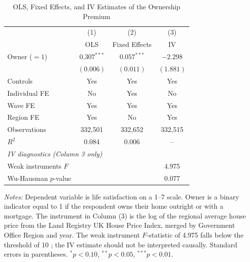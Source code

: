 \documentclass[12pt,a4paper]{article}
\begin{document}
\clearpage
\begin{table}[H]
\centering
\caption{OLS, Fixed Effects, and IV Estimates of the Ownership Premium}
\label{tab:iv}
\begin{threeparttable}
\begin{tabular}{lccc}
\toprule
 & (1) & (2) & (3) \\
 & OLS & Fixed Effects & IV \\
\midrule
Owner ($= 1$)
  & $0.307^{***}$ & $0.057^{***}$ & $-2.298$ \\
  & $(0.006)$     & $(0.011)$     & $(1.881)$ \\[0.5em]
Controls      & Yes & Yes & Yes \\
Individual FE & No  & Yes & No  \\
Wave FE       & Yes & Yes & Yes \\
Region FE     & Yes & No  & Yes \\
\midrule
Observations  & 332{,}501 & 332{,}652 & 332{,}515 \\
$R^{2}$       & 0.084     & 0.006     & --        \\[0.5em]
\multicolumn{4}{l}{\textit{IV diagnostics (Column 3 only)}} \\[0.2em]
Weak instruments $F$ & & & 4.975 \\
Wu-Hausman $p$-value & & & 0.077 \\
\bottomrule
\end{tabular}
\begin{tablenotes}
\small
\item \textit{Notes:} Dependent variable is life satisfaction on a 1--7
scale. Owner is a binary indicator equal to 1 if the respondent owns
their home outright or with a mortgage. The instrument in Column (3)
is the log of the regional average house price from the Land Registry
UK House Price Index, merged by Government Office Region and year.
The weak instrument $F$-statistic of 4.975 falls below the threshold
of 10 \citep{Staiger1997}; the IV estimate should not be interpreted
causally. Standard errors in parentheses.
$^{*}p < 0.10$, $^{**}p < 0.05$, $^{***}p < 0.01$.
\end{tablenotes}
\end{threeparttable}
\end{table}
\end{document}
